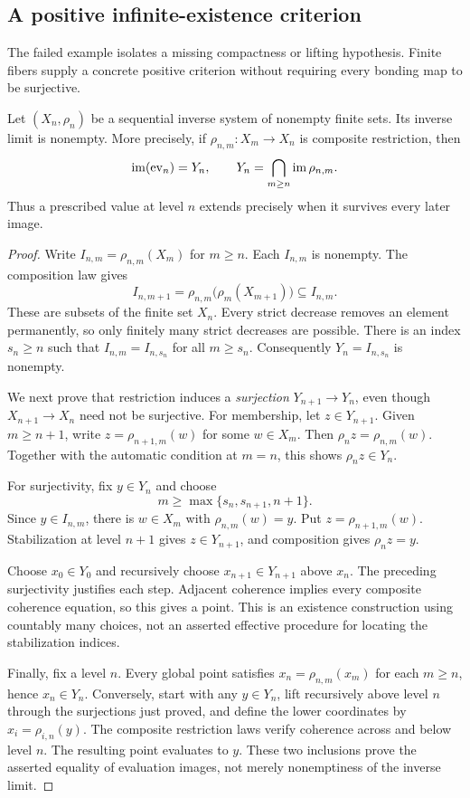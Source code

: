 \subsection{A positive infinite-existence criterion}
The failed example isolates a missing compactness or lifting hypothesis. Finite fibers supply a concrete positive criterion without requiring every bonding map to be surjective.

\begin{proposition}\label{KS58}
Let \((X_n,\rho_n)\) be a sequential inverse system of nonempty finite sets. Its inverse limit is nonempty. More precisely, if \(\rho_{n,m}:X_m\to X_n\) is composite restriction, then
\[
 \operatorname{im}(\operatorname{ev}_n)=Y_n,
 \qquad Y_n=\bigcap_{m\ge n}\operatorname{im}\rho_{n,m}.
\]
Thus a prescribed value at level \(n\) extends precisely when it survives every later image.
\end{proposition}
\begin{proof}
Write \(I_{n,m}=\rho_{n,m}(X_m)\) for \(m\ge n\). Each \(I_{n,m}\) is nonempty. The composition law gives
\[
 I_{n,m+1}=\rho_{n,m}\bigl(\rho_m(X_{m+1})\bigr)\subseteq I_{n,m}.
\]
These are subsets of the finite set \(X_n\). Every strict decrease removes an element permanently, so only finitely many strict decreases are possible. There is an index \(s_n\ge n\) such that \(I_{n,m}=I_{n,s_n}\) for all \(m\ge s_n\). Consequently \(Y_n=I_{n,s_n}\) is nonempty.

We next prove that restriction induces a \emph{surjection} \(Y_{n+1}\to Y_n\), even though \(X_{n+1}\to X_n\) need not be surjective. For membership, let \(z\in Y_{n+1}\). Given \(m\ge n+1\), write \(z=\rho_{n+1,m}(w)\) for some \(w\in X_m\). Then \(\rho_n z=\rho_{n,m}(w)\). Together with the automatic condition at \(m=n\), this shows \(\rho_nz\in Y_n\).

For surjectivity, fix \(y\in Y_n\) and choose
\[
 m\ge\max\{s_n,s_{n+1},n+1\}.
\]
Since \(y\in I_{n,m}\), there is \(w\in X_m\) with \(\rho_{n,m}(w)=y\). Put \(z=\rho_{n+1,m}(w)\). Stabilization at level \(n+1\) gives \(z\in Y_{n+1}\), and composition gives \(\rho_nz=y\).

Choose \(x_0\in Y_0\) and recursively choose \(x_{n+1}\in Y_{n+1}\) above \(x_n\). The preceding surjectivity justifies each step. Adjacent coherence implies every composite coherence equation, so this gives a point. This is an existence construction using countably many choices, not an asserted effective procedure for locating the stabilization indices.

Finally, fix a level \(n\). Every global point satisfies \(x_n=\rho_{n,m}(x_m)\) for each \(m\ge n\), hence \(x_n\in Y_n\). Conversely, start with any \(y\in Y_n\), lift recursively above level \(n\) through the surjections just proved, and define the lower coordinates by \(x_i=\rho_{i,n}(y)\). The composite restriction laws verify coherence across and below level \(n\). The resulting point evaluates to \(y\). These two inclusions prove the asserted equality of evaluation images, not merely nonemptiness of the inverse limit.
\end{proof}
